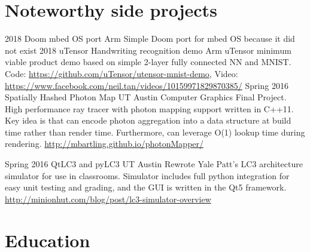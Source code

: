 \documentclass[]{friggeri-cv} %
\begin{document}
\section{Noteworthy side projects}
\begin{entrylist}
\entry
{2018}
{Doom mbed OS port}
{Arm}
{Simple Doom port for mbed OS because it did not exist}
\entry
{2018}
{uTensor Handwriting recognition demo}
{Arm}
{uTensor minimum viable product demo based on simple 2-layer fully connected NN and MNIST. Code: \url{https://github.com/uTensor/utensor-mnist-demo}, Video: \url{https://www.facebook.com/neil.tan/videos/10159971829870385/}}
\entry
{Spring 2016}
{Spatially Hashed Photon Map}
{UT Austin}
{Computer Graphics Final Project. High performance ray tracer with photon mapping support written in C++11. Key idea is that can encode photon aggregation into a data structure at build time rather than render time. 
Furthermore, can leverage O(1) lookup time during rendering. \url{http://mbartling.github.io/photonMapper/}}
\end{entrylist}
\begin{entrylist}
\entry
{Spring 2016}
{QtLC3 and pyLC3}
{UT Austin}
{Rewrote Yale Patt's LC3 architecture simulator for use in classrooms. Simulator includes full python integration for easy unit testing and grading, and the GUI is written in the Qt5 framework. \url{http://minionhut.com/blog/post/lc3-simulator-overview}}


\end{entrylist}



\section{Education}
\end{document}
